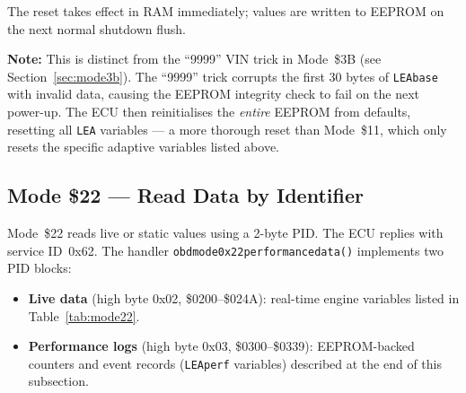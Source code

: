 \documentclass[a4paper,11pt]{article}
\renewcommand{\_}{\oldunderscore\allowbreak}
\begin{document}
The reset takes effect in RAM immediately; values are written to EEPROM on the
next normal shutdown flush.

\textbf{Note:} This is distinct from the ``9999'' VIN trick in Mode~\$3B
(see Section~\ref{sec:mode3b}). The ``9999'' trick corrupts the first 30 bytes
of \texttt{LEA\_base} with invalid data, causing the EEPROM integrity check to
fail on the next power-up. The ECU then reinitialises the \emph{entire} EEPROM
from defaults, resetting all \texttt{LEA\_} variables --- a more thorough reset
than Mode~\$11, which only resets the specific adaptive variables listed above.

\newpage
\subsection{Mode \$22 --- Read Data by Identifier}

Mode~\$22 reads live or static values using a 2-byte PID. The ECU replies with
service ID~0x62. The handler \texttt{obd\_mode\_0x22\_performance\_data()}
implements two PID blocks:

\begin{itemize}
\item \textbf{Live data} (high byte 0x02, \$0200--\$024A): real-time engine
      variables listed in Table~\ref{tab:mode22}.
\item \textbf{Performance logs} (high byte 0x03, \$0300--\$0339):
      EEPROM-backed counters and event records (\texttt{LEA\_perf\_*}
      variables) described at the end of this subsection.
\end{itemize}
\end{document}
